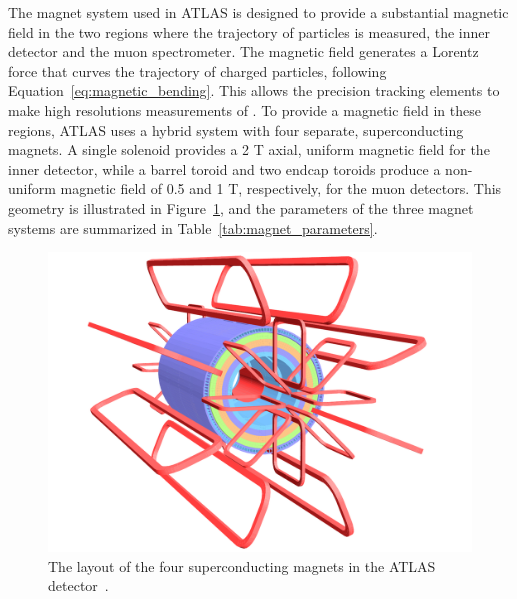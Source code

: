 The magnet system used in ATLAS is designed to provide a substantial magnetic field in the two regions where the trajectory of particles is measured, the inner detector and the muon spectrometer.
The magnetic field generates a Lorentz force that curves the trajectory of charged particles, following Equation~\ref{eq:magnetic_bending}.
This allows the precision tracking elements to make high resolutions measurements of \pt.
To provide a magnetic field in these regions, ATLAS uses a hybrid system with four separate, superconducting magnets.
A single solenoid provides a 2 T axial, uniform magnetic field for the inner detector, while a barrel toroid and two endcap toroids produce a non-uniform magnetic field of 0.5 and 1 T, respectively, for the muon detectors.
This geometry is illustrated in Figure~\ref{fig:magnets_overview}, and the parameters of the three magnet systems are summarized in Table~\ref{tab:magnet_parameters}.

\begin{figure}[hbtp]
\centering
\includegraphics[width=\fullfig]{figures/magnets_overview.pdf}
\caption{The layout of the four superconducting magnets in the ATLAS detector~\cite{atlas_experiment}.}
\label{fig:magnets_overview}
\end{figure}

